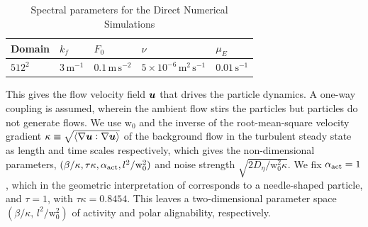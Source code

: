 \documentclass[../Rajarshi-thesis-draft.tex]{subfiles}
\begin{document}
\begin{table}[h]
    \centering
    
    \begin{tabular}{p{2cm} p{1.5cm} p{2cm} p{3cm} p{1.2cm}}
    \toprule
    Domain & $k_f$ & $F_0$ & $\nu$ & $\mu_E$ \\
    \midrule
    $512^2$ &
    $3\,\mathrm{m}^{-1}$ &
    $0.1\,\mathrm{m\,s^{-2}}$ &
    $5\times10^{-6}\,\mathrm{m^2\,s^{-1}}$ &
    $0.01\,\mathrm{s^{-1}}$ \\
    \bottomrule
    \end{tabular}
    
    \caption[Spectral parameters for the direct numerical simulations]{Spectral parameters for the Direct Numerical Simulations}
    \label{act-dns}
    \end{table}
This gives the flow velocity field $\boldsymbol{u}$ that drives the particle dynamics. A one-way coupling is assumed, wherein the ambient flow stirs the particles but particles do not generate flows. We use $\mathrm{w}_{0}$ and the inverse of the root-mean-square velocity gradient
$\kappa \equiv \sqrt{\langle \nabla \boldsymbol{u}:\nabla \boldsymbol{u}\rangle}$
of the background flow in the turbulent steady state as length and time scales respectively, which gives the non-dimensional parameters, $({\beta/\kappa}, \tau \kappa, \alpha_{\rm act}, {l}^2/\mathrm{w}^{2}_{0})$
and noise strength $\sqrt{2D_\eta/ \mathrm{w}^{2}_{0}\kappa}$.
We fix $\alpha_{\rm act} = 1$, which in the geometric interpretation of \cite{Jeffery1922} corresponds to a needle-shaped particle, and $\tau = 1$, with $\tau\kappa = 0.8454$. This leaves a two-dimensional parameter space $({\beta/\kappa}, \, {l}^2/\mathrm{w}^{2}_{0})$ of activity and polar alignability, respectively.
\end{document}
